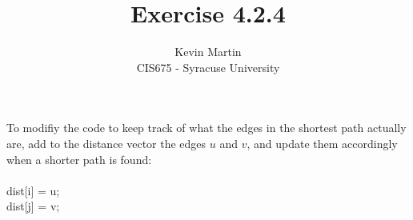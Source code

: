 \documentclass{article}
\author{Kevin Martin\\ CIS675 - Syracuse University}
\title{Exercise 4.2.4}
\begin{document}
\maketitle
To modifiy the code to keep track of what the edges in the shortest path
actually are, add to the distance vector the edges $u$ and $v$, and 
update them accordingly when a shorter path is found:\\\\
dist[i] = u;\\
dist[j] = v;\\
\end{document}
